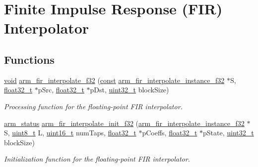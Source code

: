 \hypertarget{group___f_i_r___interpolate}{\section{Finite Impulse Response (F\-I\-R) Interpolator}
\label{group___f_i_r___interpolate}
}
\subsection*{Functions}
\begin{DoxyCompactItemize}
\item 
\hyperlink{group___n_a_m_e_ga18028b8badbf1ea7e704ccac3c488e82}{void} \hyperlink{group___f_i_r___interpolate_ga9cae104c5cf60b4e7671c82264a8c12e}{arm\-\_\-fir\-\_\-interpolate\-\_\-f32} (\hyperlink{group___n_a_m_e_ga7ae6d0e43244213b34de2c2b9aa30da6}{const} \hyperlink{structarm__fir__interpolate__instance__f32}{arm\-\_\-fir\-\_\-interpolate\-\_\-instance\-\_\-f32} $\ast$S, \hyperlink{arm__math_8h_a4611b605e45ab401f02cab15c5e38715}{float32\-\_\-t} $\ast$p\-Src, \hyperlink{arm__math_8h_a4611b605e45ab401f02cab15c5e38715}{float32\-\_\-t} $\ast$p\-Dst, \hyperlink{stdint_8h_a435d1572bf3f880d55459d9805097f62}{uint32\-\_\-t} block\-Size)
\begin{DoxyCompactList}\small\item\em Processing function for the floating-\/point F\-I\-R interpolator. \end{DoxyCompactList}\item 
\hyperlink{arm__math_8h_a5e459c6409dfcd2927bb8a57491d7cf6}{arm\-\_\-status} \hyperlink{group___f_i_r___interpolate_ga0f857457a815946f7e4dca989ebf6ff6}{arm\-\_\-fir\-\_\-interpolate\-\_\-init\-\_\-f32} (\hyperlink{structarm__fir__interpolate__instance__f32}{arm\-\_\-fir\-\_\-interpolate\-\_\-instance\-\_\-f32} $\ast$S, \hyperlink{stdint_8h_aba7bc1797add20fe3efdf37ced1182c5}{uint8\-\_\-t} L, \hyperlink{stdint_8h_a273cf69d639a59973b6019625df33e30}{uint16\-\_\-t} num\-Taps, \hyperlink{arm__math_8h_a4611b605e45ab401f02cab15c5e38715}{float32\-\_\-t} $\ast$p\-Coeffs, \hyperlink{arm__math_8h_a4611b605e45ab401f02cab15c5e38715}{float32\-\_\-t} $\ast$p\-State, \hyperlink{stdint_8h_a435d1572bf3f880d55459d9805097f62}{uint32\-\_\-t} block\-Size)
\begin{DoxyCompactList}\small\item\em Initialization function for the floating-\/point F\-I\-R interpolator. \end{DoxyCompactList}\item 

\end{DoxyCompactItemize}
